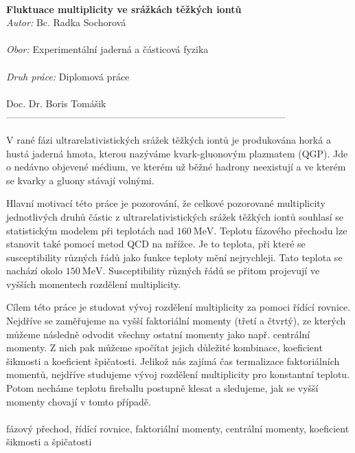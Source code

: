 \thispagestyle{empty}

\\
{\bf Fluktuace multiplicity ve srážkách těžkých iontů}\\

\noindent
{\it Autor:} Bc. Radka Sochorov\'a  \\
\\
\noindent
{\it Obor:}       Experiment\'aln\'i  jadern\'a  a \v{c}\'asticov\'a  fyzika\\
\\
\noindent
{\it Druh práce:} Diplomová práce\\
\\
 Doc. Dr. Boris Tom\'a\v{s}ik\\  --------------------------------------------------------------------------------------- \\


V rané fázi ultrarelativistických srážek těžkých iontů je produkována horká a hustá jaderná hmota, kterou nazýváme kvark-gluonovým plazmatem (QGP). Jde o nedávno objevené médium, ve kterém už běžné hadrony neexistují a ve kterém se kvarky a gluony stávají volnými. 

Hlavní motivací této práce je pozorování, že celkové pozorované multiplicity jednotlivých druhů částic z ultrarelativistických srážek těžkých iontů souhlasí se statistickým modelem při teplotách nad $160 ~\mathrm{MeV}$. Teplotu fázového přechodu lze stanovit také pomocí metod QCD na mřížce. Je to teplota, při které se susceptibility různých řádů jako funkce teploty mění nejrychleji. Tato teplota se nachází okolo $150 ~\mathrm{MeV}$. Susceptibility různých řádů se přitom projevují ve vyšších momentech rozdělení multiplicity.

Cílem této práce je studovat vývoj rozdělení multiplicity za pomoci řídící rovnice. Nejdříve se zaměřujeme na vyšší faktoriální momenty (třetí a čtvrtý), ze kterých můžeme následně odvodit všechny ostatní momenty jako např. centrální momenty. Z nich pak můžeme spočítat jejich důležité kombinace, koeficient šikmosti a koeficient špičatosti. Jelikož nás zajímá čas termalizace faktoriálních momentů, nejdříve studujeme vývoj rozdělení multiplicity pro konstantní teplotu. Potom necháme teplotu fireballu postupně klesat a sledujeme, jak se vyšší momenty chovají v tomto případě.  
\\
\\
 fázový přechod, řídící rovnice, faktoriální momenty, centrální momenty, koeficient šikmosti a špičatosti

